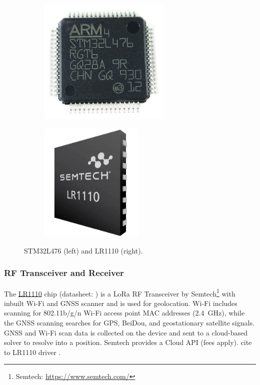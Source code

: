 \begin{figure}[H]
    \centering
    \begin{subfigure}{.45\textwidth}
      \centering
      \includegraphics[width=0.7\textwidth]{figures/STM32L476.jpg}
    \end{subfigure}
    \begin{subfigure}{.45\textwidth}
      \centering
      \includegraphics[width=0.55\textwidth]{figures/LR1110.png}
    \end{subfigure}
    \caption{STM32L476 (left) and LR1110 (right).}
    \label{fig:chips}
\end{figure}

\subsubsection{RF Transceiver and Receiver}
The \hyperref[bom:lr1110]{LR1110} chip (datasheet: ) is a \ac{LoRa} RF Transceiver by Semtech\footnote{Semtech: \url{https://www.semtech.com/}} with inbuilt Wi-Fi and \ac{GNSS} scanner and is used for geolocation. Wi-Fi includes scanning for 802.11b/g/n Wi-Fi access point \ac{MAC} addresses (\SI{2.4}{\giga\hertz}), while the \ac{GNSS} scanning searches for \ac{GPS}, BeiDou, and geostationary satellite signals. \ac{GNSS} and Wi-Fi scan data is collected on the device and sent to a cloud-based solver to resolve into a position. Semtech provides a Cloud API (fees apply).
cite to LR1110 driver \cite{lr11xx_driver}.

